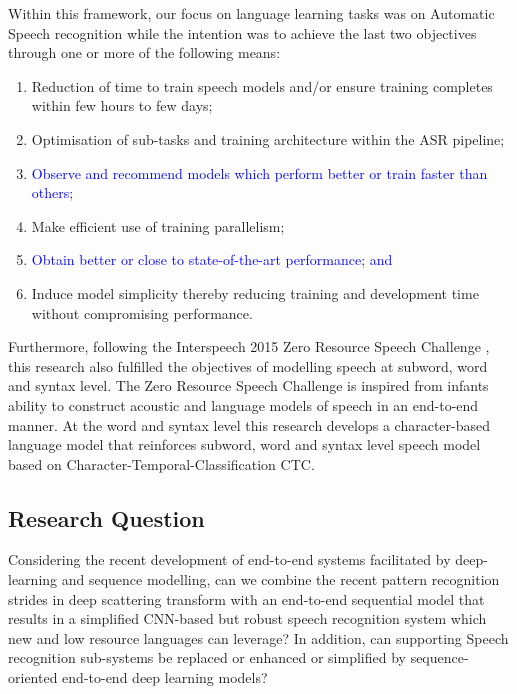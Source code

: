 Within this framework, our focus on language learning tasks was on Automatic Speech recognition while the intention was to achieve the last two objectives through one or more of the following means:
\begin{enumerate}
    \item Reduction of time to train speech models and/or ensure training completes within few hours to few days;
    \item Optimisation of sub-tasks and training architecture within the ASR pipeline;
    \item \textcolor{blue}{Observe and recommend models which perform better or train faster than others;}
    \item Make efficient use of training parallelism;
    \item \textcolor{blue}{Obtain better or close to state-of-the-art performance; and}
    \item Induce model simplicity thereby reducing training and development time without compromising performance.
\end{enumerate}

Furthermore, following the Interspeech 2015 Zero Resource Speech Challenge \citep{versteegh2015zero}, this research also fulfilled the objectives of modelling speech at subword, word and syntax level. The Zero Resource Speech Challenge is inspired from infants ability to construct acoustic and language models of speech in an end-to-end manner. At the word and syntax level this research develops a character-based language model that reinforces subword, word and syntax level speech model based on Character-Temporal-Classification CTC.

\startblue
\subsection{Research Question}
Considering the recent development of end-to-end systems facilitated by deep-learning and sequence modelling, can we combine the recent pattern recognition strides in deep scattering transform with an end-to-end sequential model that results in a simplified CNN-based but robust speech recognition system which new and low resource languages can leverage?  In addition, can supporting Speech recognition sub-systems be replaced or enhanced or simplified by sequence-oriented end-to-end deep learning models?
\stopblue

